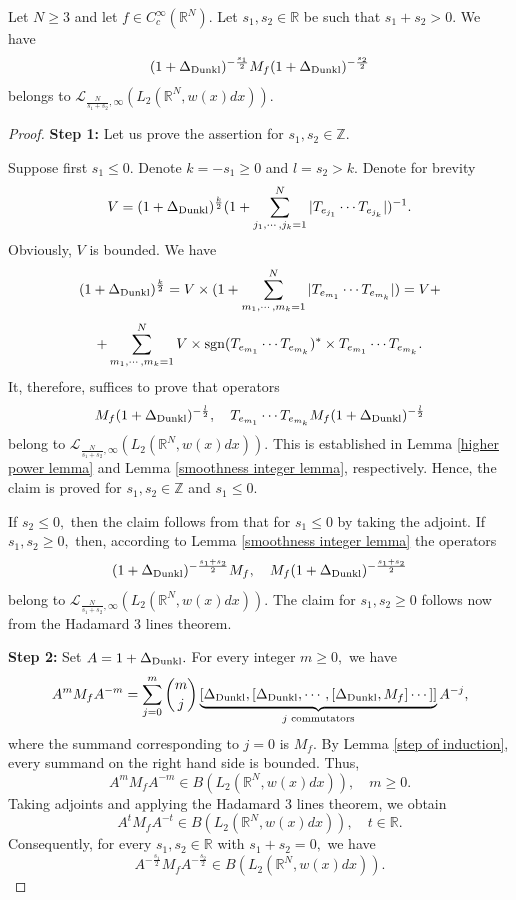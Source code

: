 \documentclass{amsart}
\begin{document}
\begin{lemma}\label{smoothness final lemma} Let $N\geq3$ and let $f\in C_c^\infty(\mathbb{R}^N).$ Let $s_1,s_2\in\mathbb{R}$ be such that $s_1+s_2>0.$ We have
$$(1+\Delta_{{\rm Dunkl}})^{-\frac{s_1}{2}} M_f(1+\Delta_{{\rm Dunkl}})^{-\frac{s_2}{2}}$$
belongs to $\mathcal{L}_{\frac{N}{s_1+s_2},\infty}(L_2(\mathbb{R}^N,w(x)dx)).$
\end{lemma}
\begin{proof} {\bf Step 1:} Let us prove the assertion for $s_1,s_2\in\mathbb{Z}.$

Suppose first $s_1\leq 0.$ Denote $k=-s_1\geq0$ and $l=s_2>k.$ Denote for brevity
$$V=(1+\Delta_{{\rm Dunkl}})^{\frac{k}{2}}(1+\sum_{j_1,\cdots,j_k=1}^N|T_{e_{j_1}}\cdots T_{e_{j_k}}|)^{-1}.$$
Obviously, $V$ is bounded. We have
$$(1+\Delta_{{\rm Dunkl}})^{\frac{k}{2}}=V\times (1+\sum_{m_1,\cdots,m_k=1}^N|T_{e_{m_1}}\cdots T_{e_{m_k}}|)=V+$$
$$+\sum_{m_1,\cdots,m_k=1}^NV\times{\rm sgn}(T_{e_{m_1}}\cdots T_{e_{m_k}})^{\ast}\times T_{e_{m_1}}\cdots T_{e_{m_k}}.$$
It, therefore, suffices to prove that operators
$$M_f(1+\Delta_{{\rm Dunkl}})^{-\frac{l}{2}},\quad T_{e_{m_1}}\cdots T_{e_{m_k}}M_f(1+\Delta_{{\rm Dunkl}})^{-\frac{l}{2}}$$
belong to $\mathcal{L}_{\frac{N}{s_1+s_2},\infty}(L_2(\mathbb{R}^N,w(x)dx)).$
This is established in Lemma \ref{higher power lemma} and Lemma \ref{smoothness integer lemma}, respectively. Hence, the claim is proved for $s_1,s_2\in\mathbb{Z}$ and $s_1\leq0.$

If $s_2\leq 0,$ then the claim follows from that for {\color{red}$s_1\leq0$} by taking the adjoint. If $s_1,s_2\geq0,$ then, according to Lemma \ref{smoothness integer lemma} the operators
$$(1+\Delta_{{\rm Dunkl}})^{-\frac{s_1+s_2}{2}} M_f,\quad M_f(1+\Delta_{{\rm Dunkl}})^{-\frac{s_1+s_2}{2}}$$
belong to $\mathcal{L}_{\frac{N}{s_1+s_2},\infty}(L_2(\mathbb{R}^N,w(x)dx)).$ The claim for $s_1,s_2\geq0$ follows now from the Hadamard 3 lines theorem.

{\bf Step 2:} Set $A=1+\Delta_{{\rm Dunkl}}.$
For every integer $m\geq0,$ we have
$$A^mM_fA^{-m}=\sum_{j=0}^m\binom{m}{j}\underbrace{[\Delta_{{\rm Dunkl}},[\Delta_{{\rm Dunkl}},
\cdots,[\Delta_{{\rm Dunkl}},M_f]\cdots]]}_{j\text{ commutators}}A^{-j},$$
where the summand corresponding to $j=0$ is $M_f$.
By Lemma \ref{step of induction}, every summand on the right hand side is bounded. Thus,
$$A^mM_fA^{-m}\in B(L_2(\mathbb{R}^N,w(x)dx)),\quad m\geq0.$$
Taking adjoints and applying the Hadamard 3 lines theorem, we obtain
$$A^tM_fA^{-t}\in B(L_2(\mathbb{R}^N,w(x)dx)),\quad t\in\mathbb{R}.$$
Consequently, for every $s_1,s_2\in\mathbb{R}$ with
$s_1+s_2=0,$ we have
$$A^{-\frac{s_1}{2}}M_fA^{-\frac{s_2}{2}}\in B(L_2(\mathbb{R}^N,w(x)dx)).$$


\end{proof}
\end{document}
